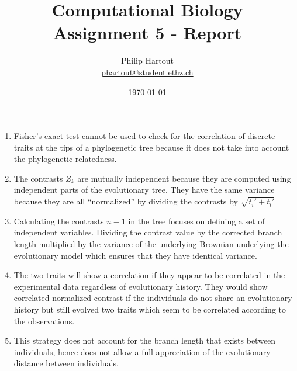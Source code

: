 \documentclass[a4paper,10pt,twoside]{article}
\title{Computational Biology \\ Assignment 5 - Report}
\author{Philip Hartout \\ \url{phartout@student.ethz.ch}}
\date{\today}
\begin{document}
\maketitle

\begin{enumerate}
    \item Fisher's exact test cannot be used to check for the correlation of discrete traits at the tips of a phylogenetic tree because it does not take into account the phylogenetic relatedness. 
    \item The contrasts $Z_k$ are mutually independent because they are computed using independent parts of the evolutionary tree. They have the same variance because they are all ``normalized'' by dividing the contrasts by $\sqrt{t_i'+t_l'}$
    \item Calculating the contrasts $n-1$ in the tree focuses on defining a set of independent variables. Dividing the contrast value by the corrected branch length multiplied by the variance of the underlying Brownian underlying the evolutionary model which ensures that they have identical variance. 
    \item The two traits will show a correlation if they appear to be correlated in the experimental data regardless of evolutionary history. They would show correlated normalized contrast if the individuals do not share an evolutionary history but still evolved two traits which seem to be correlated according to the observations.
    \item This strategy does not account for the branch length that exists between individuals, hence does not allow a full appreciation of the evolutionary distance between individuals. 
\end{enumerate}
\end{document}

